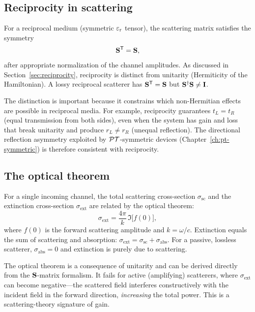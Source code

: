 \subsection{Reciprocity in scattering}
\label{ssec:smatrix-reciprocity}

For a reciprocal medium (symmetric $\varepsilon_{\mathrm{r}}$ tensor), the scattering matrix
satisfies the symmetry
\begin{equation}
 \mathbf{S}^{\mathsf{T}} = \mathbf{S},
 \label{eq:smatrix-reciprocal}
\end{equation}
after appropriate normalization of the channel amplitudes. As discussed in
Section~\ref{sec:reciprocity}, reciprocity is distinct from unitarity
(Hermiticity of the Hamiltonian). A lossy reciprocal scatterer has
$\mathbf{S}^{\mathsf{T}} = \mathbf{S}$ but $\mathbf{S}^\dagger\mathbf{S} \neq \mathbf{I}$.

The distinction is important because it constrains which non-Hermitian
effects are possible in reciprocal media. For example, reciprocity
guarantees $t_L = t_R$ (equal transmission from both sides), even when the
system has gain and loss that break unitarity and produce
$r_L \neq r_R$ (unequal reflection). The directional reflection asymmetry
exploited by $\mathcal{PT}$-symmetric devices (Chapter~\ref{ch:pt-symmetric}) is
therefore consistent with reciprocity.

\subsection{The optical theorem}
\label{ssec:optical-theorem}

For a single incoming channel, the total scattering cross-section
$\sigma_{\mathrm{sc}}$ and the extinction cross-section
$\sigma_{\mathrm{ext}}$ are related by the optical theorem:
\begin{equation}
 \sigma_{\mathrm{ext}} = \frac{4\pi}{k}\,\Im\!\bigl[f(0)\bigr],
 \label{eq:optical-theorem}
\end{equation}
where $f(0)$ is the forward scattering amplitude and $k = \omega/c$.
Extinction equals the sum of scattering and absorption:
$\sigma_{\mathrm{ext}} = \sigma_{\mathrm{sc}} + \sigma_{\mathrm{abs}}$.
For a passive, lossless scatterer, $\sigma_{\mathrm{abs}} = 0$ and
extinction is purely due to scattering.

The optical theorem is a consequence of unitarity and can be derived
directly from the $\mathbf{S}$-matrix formalism. It fails for active
(amplifying) scatterers, where $\sigma_{\mathrm{ext}}$ can become
negative---the scattered field interferes constructively with the incident
field in the forward direction, \emph{increasing} the total power. This
is a scattering-theory signature of gain.



